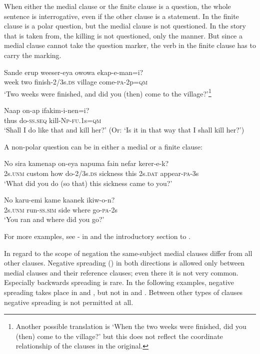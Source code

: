 When either the medial clause or the finite clause is a question, the whole sentence is interrogative, even if the other clause is a statement. In  the finite clause is a polar question, but the medial clause is not questioned. In the story that  is taken from, the killing is not questioned, only the manner. But since a medial clause cannot take the question marker, the verb in the finite clause has to carry the marking.

\ea%
\label{ex:8:x1449}
\gll Sande  erup  weeser-eya  owowa  ekap-e-man=i? \\
week  two  finish-2/3s.\textsc{ds} village  come-\textsc{pa}-2p=\textsc{qm}\\
\glt`Two weeks were finished, and did you (then) come to the village?'\footnote{Another possible translation is `When the two weeks were finished, did you (then) come to the village?' but this does not reflect the coordinate relationship of the clauses in the original.}
\z


\ea%
\label{ex:8:x1452}
\gll Naap  on-ap  ifakim-i-nen=i?\\
thus do-\textsc{ss}.\textsc{seq} kill-\textsc{Np}-\textsc{fu}.1s=\textsc{qm}\\
\glt`Shall I do like that and kill her?' (Or: `Is it in that way that I shall kill her?')
\z


A non-polar question can be in either a medial or a finite clause:

\ea%
\label{ex:8:x1451}
\gll No  sira  kamenap  on-eya  napuma  fain nefar  kerer-e-k?\\
2s.\textsc{unm} custom  how  do-2/3s.\textsc{ds} sickness  this 2s.\textsc{dat} appear-\textsc{pa}-3s\\
\glt`What did you do (so that) this sickness came to you?'
\z


\ea%
\label{ex:8:x1450}
\gll No  karu-emi  kame  kaanek  ikiw-o-n? \\
2s.\textsc{unm} run-\textsc{ss}.\textsc{sim} side  where  go-\textsc{pa}-2s\\
\glt`You ran and where did you go?'
\z


For more examples, see - in  and the introductory section to . 

In regard to the scope of negation the same-subject medial clauses differ from all other clauses.  Negative spreading () in both directions is allowed only between  medial clauses and their reference clauses; even there it is not very common. Especially backwards spreading is rare. In the following examples, negative spreading takes place in  and , but not in  and . Between other types of clauses negative spreading is not permitted at all. 

